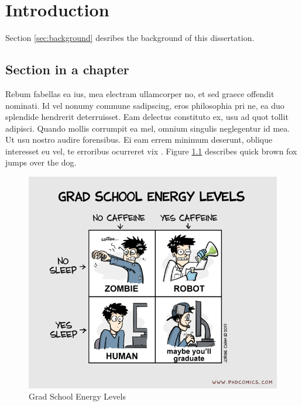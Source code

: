\documentclass[copyright, reqno]{vcuthesis}
\numberwithin{equation}{chapter}
\begin{document}
\clearpage

\chapter{Introduction \label{chap:chapintro} }
Section \ref{sec:background} desribes the background of this dissertation.
\section{Section in a chapter \label{sec:background} }
Rebum fabellas ea ius, mea electram ullamcorper no, et sed graece offendit nominati. Id vel nonumy commune sadipscing, eros philosophia pri ne, ea duo splendide hendrerit deterruisset. Eam delectus constituto ex, usu ad quot tollit adipisci. Quando mollis corrumpit ea mel, omnium singulis neglegentur id mea. Ut usu nostro audire forensibus. Ei eam errem minimum deserunt, oblique interesset eu vel, te erroribus ocurreret vix \cite{Narendra_1990}. Figure \ref{fig:fig1} describes quick brown fox jumps over the dog.

\begin{figure}
\centering
\includegraphics[scale=0.6]{figures/phd.png}
\caption{Grad School Energy Levels}
\label{fig:fig1}
\end{figure}

\begin{table}
	\caption{\label{table:t1} Table Title}
	\vspace{0.15in}
	\centering
\end{table}
\end{document}
